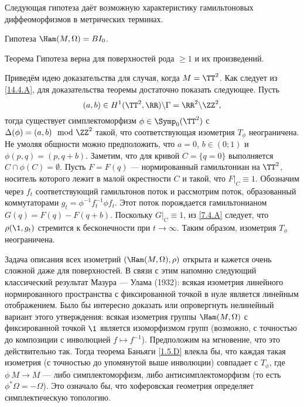 Следующая гипотеза даёт возможную характеристику гамильтоновых диффеоморфизмов в метрических терминах.

\begin{ex*}{Гипотеза}
 $\Ham(M,\Omega) = BI_0$.
\end{ex*}


\begin{thm}[(\cite{LP})]{Теорема}\label{14.4.B}
Гипотеза верна для поверхностей рода $\ge1$ и их произведений.
\end{thm}

 
Приведём идею доказательства для случая, когда $M=\TT^2$.
Как следует из \ref{14.4.A}, для доказательства теоремы достаточно показать следующее.
Пусть
\[(a,b)\in H^1(\TT^2,\RR)\backslash\Gamma=\RR^2\backslash\ZZ^2,\]
тогда существует симплектоморфизм $\phi\in\Symp_0(\TT^2)$ с $\Delta (\phi) = (a, b) \mod \ZZ^2$ такой, что соответствующая изометрия $T_\phi$ неограничена.
Не умоляя общности можно предположить, что $a= 0$, $b \in (0; 1)$ и $\phi(p, q) = (p, q + b)$.
Заметим, что для кривой $C = \{q = 0\}$ выполняется $C \cap \phi(C) = \emptyset$.
Пусть $F = F(q)$ --- нормированный гамильтониан на $\TT^2$, носитель которого лежит в малой окрестности $C$ и такой, что $F|_C \equiv 1$.
Обозначим через $f_t$ соответствующий гамильтонов поток и рассмотрим поток, образованный коммутаторами $g_t = \phi^{-1}f_t^{-1}\phi f_t$.
Этот поток порождается гамильтонианом $G(q) = F(q) - F(q + b)$.
Поскольку $G|_C \equiv 1$, из \ref{7.4.A} следует, что $\rho(\1, g_t)$ стремится к бесконечности при $t \to \infty$.
Таким образом, изометрия $T_\phi$ неограничена.

Задача описания всех изометрий $(\Ham(M,\Omega), \rho)$ открыта и кажется очень сложной даже для поверхностей.
В связи с этим напомню следующий классический результат Мазура --- Улама \cite{MU} (1932): всякая изометрия линейного нормированного пространства с фиксированной точкой в нуле является линейным отображением.
Было бы интересно доказать или опровергнуть нелинейный вариант этого утверждения: всякая изометрия группы $\Ham(M,\Omega)$ с фиксированной точкой $\1$ является изоморфизмом групп (возможно, с точностью до композиции с инволюцией $f\mapsto f^{-1}$).
Предположим на мгновение, что это действительно так.
Тогда теорема Баньяги \ref{1.5.D} влекла бы, что каждая такая изометрия (с точностью до упомянутой выше инволюции) совпадает с $T_\phi$, где $\phi\: M \to M$ --- либо симплектоморфизм, либо антисимплектоморфизм (то есть $\phi^\ast\Omega = -\Omega$).
Это означало бы, что хоферовская геометрия определяет симплектическую топологию.
